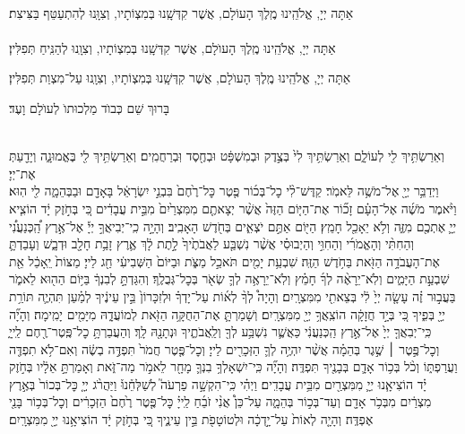 \documentclass[twoside, openany, parskip=half, 11pt]{book}
\begin{document}
\\
אַתָּה יְיָ, אֱלֹהֵֽינוּ מֶֽלֶךְ הָעוֹלָם, אֲשֶׁר קִדְּשָֽׁנוּ בְּמִצְוֹתָיו, וְצִוָּֽנוּ לְהִתְעַטֵּף בַּצִּיצִת׃\\
\\
אַתָּה יְיָ, אֱלֹהֵֽינוּ מֶֽלֶךְ הָעוֺלָם, אֲשֶׁר קִדְּשָֽׁנוּ בְּמִצְוֹתָיו, וְצִוָֽנוּ לְהַנִּֽיחַ תְּפִלִּין׃

אַתָּה יְיָ, אֱלֹהֵֽינוּ מֶֽלֶךְ הָעוֺלָם, אֲשֶׁר קִדְּשָֽׁנוּ בְּמִצְוֹתָיו, וְצִוָֽנוּ עַל־מִצְוַת תְּפִלִּין׃

בָּרוּךְ שֵׁם כְּבוֺד מַלְכוּתוֺ לְעוֺלָם וָעֶד׃


\\
וְאֵרַשְׂתִּ֥יךְ לִ֖י לְעוֹלָ֑ם וְאֵרַשְׂתִּ֥יךְ לִי֙ בְּצֶ֣דֶק וּבְמִשְׁפָּ֔ט וּבְחֶ֖סֶד וּֽבְרַחֲמִֽים׃ וְאֵרַשְׂתִּ֥יךְ לִ֖י בֶּאֱמוּנָ֑ה וְיָדַ֖עַתְּ אֶת־יְיָ׃\\
וַיְדַבֵּ֥ר יְיָ֖ אֶל־מֹשֶׁ֥ה לֵּאמֹֽר׃ קַדֶּשׁ־לִ֨י כׇל־בְּכ֜וֹר פֶּ֤טֶר כׇּל־רֶ֙חֶם֙ בִּבְנֵ֣י יִשְׂרָאֵ֔ל בָּאָדָ֖ם וּבַבְּהֵמָ֑ה לִ֖י הֽוּא׃ וַיֹּ֨אמֶר מֹשֶׁ֜ה אֶל־הָעָ֗ם זָכ֞וֹר אֶת־הַיּ֤וֹם הַזֶּה֙ אֲשֶׁ֨ר יְצָאתֶ֤ם מִמִּצְרַ֙יִם֙ מִבֵּ֣ית עֲבָדִ֔ים כִּ֚י בְּחֹ֣זֶק יָ֔ד הוֹצִ֧יא יְיָ֛ אֶתְכֶ֖ם מִזֶּ֑ה וְלֹ֥א יֵאָכֵ֖ל חָמֵֽץ׃ הַיּ֖וֹם אַתֶּ֣ם יֹצְאִ֑ים בְּחֹ֖דֶשׁ הָאָבִֽיב׃ וְהָיָ֣ה כִֽי־יְבִיאֲךָ֣ יְיָ֡ אֶל־אֶ֣רֶץ הַֽ֠כְּנַעֲנִ֠י וְהַחִתִּ֨י וְהָאֱמֹרִ֜י וְהַחִוִּ֣י וְהַיְבוּסִ֗י אֲשֶׁ֨ר נִשְׁבַּ֤ע לַאֲבֹתֶ֙יךָ֙ לָ֣תֶת לָ֔ךְ אֶ֛רֶץ זָבַ֥ת חָלָ֖ב וּדְבָ֑שׁ וְעָבַדְתָּ֛ אֶת־הָעֲבֹדָ֥ה הַזֹּ֖את בַּחֹ֥דֶשׁ הַזֶּֽה׃ שִׁבְעַ֥ת יָמִ֖ים תֹּאכַ֣ל מַצֹּ֑ת וּבַיּוֹם֙ הַשְּׁבִיעִ֔י חַ֖ג לַייָ׃ מַצּוֹת֙ יֵֽאָכֵ֔ל אֵ֖ת שִׁבְעַ֣ת הַיָּמִ֑ים וְלֹֽא־יֵרָאֶ֨ה לְךָ֜ חָמֵ֗ץ וְלֹֽא־יֵרָאֶ֥ה לְךָ֛ שְׂאֹ֖ר בְּכׇל־גְּבֻלֶֽךָ׃ וְהִגַּדְתָּ֣ לְבִנְךָ֔ בַּיּ֥וֹם הַה֖וּא לֵאמֹ֑ר בַּעֲב֣וּר זֶ֗ה עָשָׂ֤ה יְיָ֙ לִ֔י בְּצֵאתִ֖י מִמִּצְרָֽיִם׃ וְהָיָה֩ לְךָ֨ לְא֜וֹת עַל־יָדְךָ֗ וּלְזִכָּרוֹן֙ בֵּ֣ין עֵינֶ֔יךָ לְמַ֗עַן תִּהְיֶ֛ה תּוֹרַ֥ת יְיָ֖ בְּפִ֑יךָ כִּ֚י בְּיָ֣ד חֲזָקָ֔ה הוֹצִֽאֲךָ֥ יְיָ֖ מִמִּצְרָֽיִם׃ וְשָׁמַרְתָּ֛ אֶת־הַחֻקָּ֥ה הַזֹּ֖את לְמוֹעֲדָ֑הּ מִיָּמִ֖ים יָמִֽימָה׃\hfill\break
וְהָיָ֞ה כִּֽי־יְבִאֲךָ֤ יְיָ֙ אֶל־אֶ֣רֶץ הַֽכְּנַעֲנִ֔י כַּאֲשֶׁ֛ר נִשְׁבַּ֥ע לְךָ֖ וְלַֽאֲבֹתֶ֑יךָ וּנְתָנָ֖הּ לָֽךְ׃ וְהַעֲבַרְתָּ֥ כׇל־פֶּֽטֶר־רֶ֖חֶם לַֽייָ֑ וְכׇל־פֶּ֣טֶר ׀ שֶׁ֣גֶר בְּהֵמָ֗ה אֲשֶׁ֨ר יִהְיֶ֥ה לְךָ֛ הַזְּכָרִ֖ים לַייָ׃ וְכׇל־פֶּ֤טֶר חֲמֹר֙ תִּפְדֶּ֣ה בְשֶׂ֔ה וְאִם־לֹ֥א תִפְדֶּ֖ה וַעֲרַפְתּ֑וֹ וְכֹ֨ל בְּכ֥וֹר אָדָ֛ם בְּבָנֶ֖יךָ תִּפְדֶּֽה׃ וְהָיָ֞ה כִּֽי־יִשְׁאָלְךָ֥ בִנְךָ֛ מָחָ֖ר לֵאמֹ֣ר מַה־זֹּ֑את וְאָמַרְתָּ֣ אֵלָ֔יו בְּחֹ֣זֶק יָ֗ד הוֹצִיאָ֧נוּ יְיָ֛ מִמִּצְרַ֖יִם מִבֵּ֥ית עֲבָדִֽים׃ וַיְהִ֗י כִּֽי־הִקְשָׁ֣ה פַרְעֹה֮ לְשַׁלְּחֵ֒נוּ֒ וַיַּהֲרֹ֨ג יְיָ֤ כׇּל־בְּכוֹר֙ בְּאֶ֣רֶץ מִצְרַ֔יִם מִבְּכֹ֥ר אָדָ֖ם וְעַד־בְּכ֣וֹר בְּהֵמָ֑ה עַל־כֵּן֩ אֲנִ֨י זֹבֵ֜חַ לַֽייָ֗ כׇּל־פֶּ֤טֶר רֶ֙חֶם֙ הַזְּכָרִ֔ים וְכׇל־בְּכ֥וֹר בָּנַ֖י אֶפְדֶּֽה׃ וְהָיָ֤ה לְאוֹת֙ עַל־יָ֣דְכָ֔ה וּלְטוֹטָפֹ֖ת בֵּ֣ין עֵינֶ֑יךָ כִּ֚י בְּחֹ֣זֶק יָ֔ד הוֹצִיאָ֥נוּ יְיָ֖ מִמִּצְרָֽיִם׃
\end{document}
